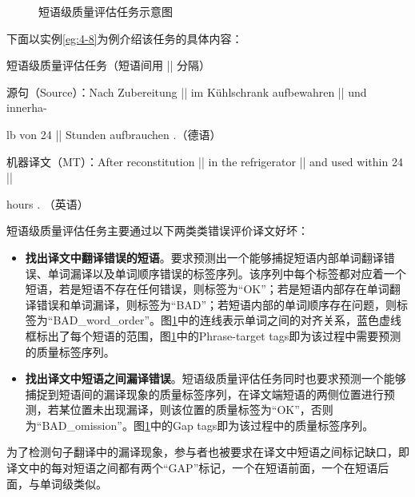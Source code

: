 \begin{figure}[htp]
    \centering
	
   \caption{短语级质量评估任务示意图}
   \label{fig:4-12}
\end{figure}

\parinterval 下面以实例\ref{eg:4-8}为例介绍该任务的具体内容：

\begin{example}
短语级质量评估任务（短语间用 || 分隔）

源句（Source）：Nach Zubereitung || im Kühlschrank aufbewahren || und innerha-

\hspace{7.3em}lb von 24 || Stunden aufbrauchen .（德语）

机器译文（MT）：After reconstitution || in the refrigerator || and used within 24 ||

 \hspace{8em}hours . （英语）
\label{eg:4-8}
\end{example}

\parinterval 短语级质量评估任务主要通过以下两类类错误评价译文好坏：

\begin{itemize}
\vspace{0.5em}
\item {\small\sffamily\bfseries{找出译文中翻译错误的短语}}。要求预测出一个能够捕捉短语内部单词翻译错误、单词漏译以及单词顺序错误的标签序列。该序列中每个标签都对应着一个短语，若是短语不存在任何错误，则标签为“OK”；若是短语内部存在单词翻译错误和单词漏译，则标签为“BAD”；若短语内部的单词顺序存在问题，则标签为“BAD\_word\_order”。图\ref{fig:4-12}中的连线表示单词之间的对齐关系，蓝色虚线框标出了每个短语的范围，图\ref{fig:4-12}中的Phrase-target tags即为该过程中需要预测的质量标签序列。
\vspace{0.5em}
\item {\small\sffamily\bfseries{找出译文中短语之间漏译错误}}。短语级质量评估任务同时也要求预测一个能够捕捉到短语间的漏译现象的质量标签序列，在译文端短语的两侧位置进行预测，若某位置未出现漏译，则该位置的质量标签为“OK”，否则为“BAD\_omission”。图\ref{fig:4-12}中的Gap tags即为该过程中的质量标签序列。
\vspace{0.5em}
\end{itemize}

\parinterval 为了检测句子翻译中的漏译现象，参与者也被要求在译文中短语之间标记缺口，即译文中的每对短语之间都有两个“GAP”标记，一个在短语前面，一个在短语后面，与单词级类似。

